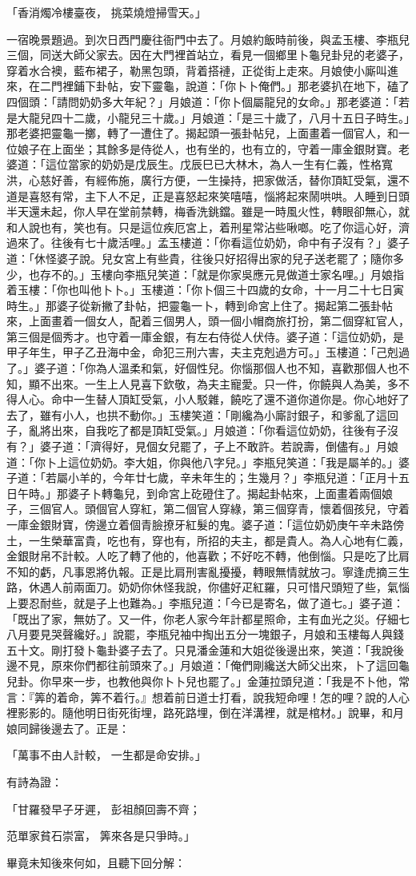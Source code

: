 「香消燭冷樓臺夜，  挑菜燒燈掃雪天。」

一宿晚景題過。到次日西門慶往衙門中去了。月娘約飯時前後，與孟玉樓、李瓶兒三個，同送大師父家去。因在大門裡首站立，看見一個鄉里卜龜兒卦兒的老婆子，穿着水合襖，藍布裙子，勒黑包頭，背着搭褳，正從街上走來。月娘使小廝叫進來，在二門裡鋪下卦帖，安下靈龜，說道：「你卜卜俺們。」那老婆扒在地下，磕了四個頭：「請問奶奶多大年紀？」月娘道：「你卜個屬龍兒的女命。」那老婆道：「若是大龍兒四十二歲，小龍兒三十歲。」月娘道：「是三十歲了，八月十五日子時生。」那老婆把靈龜一擲，轉了一遭住了。揭起頭一張卦帖兒，上面畫着一個官人，和一位娘子在上面坐；其餘多是侍從人，也有坐的，也有立的，守着一庫金銀財寶。老婆道：「這位當家的奶奶是戊辰生。戊辰巳已大林木，為人一生有仁義，性格寬洪，心慈好善，有經佈施，廣行方便，一生操持，把家做活，替你頂缸受氣，還不道是喜怒有常，主下人不足，正是喜怒起來笑嘻嘻，惱將起來鬧哄哄。人睡到日頭半天還未起，你人早在堂前禁轉，梅香洗銚鐺。雖是一時風火性，轉眼卻無心，就和人說也有，笑也有。只是這位疾厄宮上，着刑星常沾些啾啷。吃了你這心好，濟過來了。往後有七十歲活哩。」孟玉樓道：「你看這位奶奶，命中有子沒有？」婆子道：「休怪婆子說。兒女宮上有些貴，往後只好招得出家的兒子送老罷了；隨你多少，也存不的。」玉樓向李瓶兒笑道：「就是你家吳應元見做道士家名哩。」月娘指着玉樓：「你也叫他卜卜。」玉樓道：「你卜個三十四歲的女命，十一月二十七日寅時生。」那婆子從新撇了卦帖，把靈龜一卜，轉到命宮上住了。揭起第二張卦帖來，上面畫着一個女人，配着三個男人，頭一個小帽商旅打扮，第二個穿紅官人，第三個是個秀才。也守着一庫金銀，有左右侍從人伏侍。婆子道：「這位奶奶，是甲子年生，甲子乙丑海中金，命犯三刑六害，夫主克剋過方可。」玉樓道：「己剋過了。」婆子道：「你為人溫柔和氣，好個性兒。你惱那個人也不知，喜歡那個人也不知，顯不出來。一生上人見喜下欽敬，為夫主寵愛。只一件，你饒與人為美，多不得人心。命中一生替人頂缸受氣，小人駁雜，饒吃了還不道你道你是。你心地好了去了，雖有小人，也拱不動你。」玉樓笑道：「剛纔為小廝討銀子，和爹亂了這回子，亂將出來，自我吃了都是頂缸受氣。」月娘道：「你看這位奶奶，往後有子沒有？」婆子道：「濟得好，見個女兒罷了，子上不敢許。若說壽，倒儘有。」月娘道：「你卜上這位奶奶。李大姐，你與他八字兒。」李瓶兒笑道：「我是屬羊的。」婆子道：「若屬小羊的，今年廿七歲，辛未年生的；生幾月？」李瓶兒道：「正月十五日午時。」那婆子卜轉龜兒，到命宮上矻磴住了。揭起卦帖來，上面畫着兩個娘子，三個官人。頭個官人穿紅，第二個官人穿綠，第三個穿青，懷着個孩兒，守着一庫金銀財寶，傍邊立着個青臉撩牙紅髮的鬼。婆子道：「這位奶奶庚午辛未路傍土，一生榮華富貴，吃也有，穿也有，所招的夫主，都是貴人。為人心地有仁義，金銀財帛不計較。人吃了轉了他的，他喜歡；不好吃不轉，他倒惱。只是吃了比肩不知的虧，凡事恩將仇報。正是比肩刑害亂擾擾，轉眼無情就放刁。寧逢虎摘三生路，休遇人前兩面刀。奶奶你休怪我說，你儘好疋紅羅，只可惜尺頭短了些，氣惱上要忍耐些，就是子上也難為。」李瓶兒道：「今已是寄名，做了道七。」婆子道：「既出了家，無妨了。又一件，你老人家今年計都星照命，主有血光之災。仔細七八月要見哭聲纔好。」說罷，李瓶兒袖中掏出五分一塊銀子，月娘和玉樓每人與錢五十文。剛打發卜龜卦婆子去了。只見潘金蓮和大姐從後邊出來，笑道：「我說後邊不見，原來你們都往前頭來了。」月娘道：「俺們剛纔送大師父出來，卜了這回龜兒卦。你早來一步，也教他與你卜卜兒也罷了。」金蓮拉頭兒道：「我是不卜他，常言：『筭的着命，筭不着行。』想着前日道士打看，說我短命哩！怎的哩？說的人心裡影影的。隨他明日街死街埋，路死路埋，倒在洋溝裡，就是棺材。」說畢，和月娘同歸後邊去了。正是：

「萬事不由人計較，  一生都是命安排。」

有詩為證：

「甘羅發早子牙遲，  彭祖顏回壽不齊；

范單家貧石崇富，  筭來各是只爭時。」

畢竟未知後來何如，且聽下回分解：
